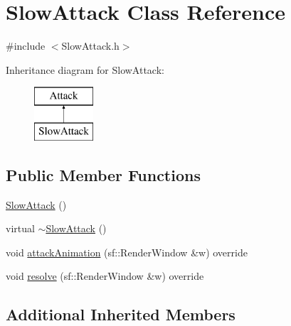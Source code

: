 \hypertarget{class_slow_attack}{\section{Slow\+Attack Class Reference}
\label{class_slow_attack}
}


{\ttfamily \#include $<$Slow\+Attack.\+h$>$}

Inheritance diagram for Slow\+Attack\+:\begin{figure}[H]
\begin{center}
\leavevmode
\includegraphics[height=2.000000cm]{class_slow_attack}
\end{center}
\end{figure}
\subsection*{Public Member Functions}
\begin{DoxyCompactItemize}
\item 
\hyperlink{class_slow_attack_ae00c267aa1ef2822860027cb33e12c79}{Slow\+Attack} ()
\item 
virtual \hyperlink{class_slow_attack_ac58dc4cbd28056655d5b005fda0fc562}{$\sim$\+Slow\+Attack} ()
\item 
void \hyperlink{class_slow_attack_afa5a9af6a5b26bdb4168ee5a909433a6}{attack\+Animation} (sf\+::\+Render\+Window \&w) override
\item 
void \hyperlink{class_slow_attack_a73767803482c26adf9aae486faa7499c}{resolve} (sf\+::\+Render\+Window \&w) override
\end{DoxyCompactItemize}
\subsection*{Additional Inherited Members}



